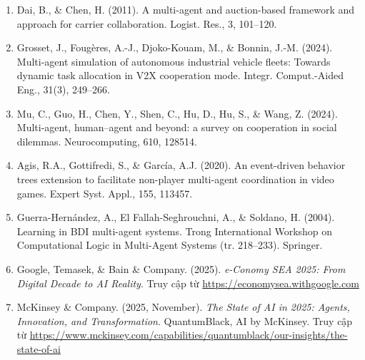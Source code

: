 \begin{enumerate}
  Laird, J.E. (2012). The Soar Cognitive Architecture. MIT Press.
\item
  Dai, B., \& Chen, H. (2011). A multi-agent and auction-based framework
  and approach for carrier collaboration. Logist. Res., 3, 101--120.
\item
  Grosset, J., Fougères, A.-J., Djoko-Kouam, M., \& Bonnin, J.-M.
  (2024). Multi-agent simulation of autonomous industrial vehicle
  fleets: Towards dynamic task allocation in V2X cooperation mode.
  Integr. Comput.-Aided Eng., 31(3), 249--266.
\item
  Mu, C., Guo, H., Chen, Y., Shen, C., Hu, D., Hu, S., \& Wang, Z.
  (2024). Multi-agent, human--agent and beyond: a survey on cooperation
  in social dilemmas. Neurocomputing, 610, 128514.
\item
  Agis, R.A., Gottifredi, S., \& García, A.J. (2020). An event-driven
  behavior trees extension to facilitate non-player multi-agent
  coordination in video games. Expert Syst. Appl., 155, 113457.
\item
  Guerra-Hernández, A., El Fallah-Seghrouchni, A., \& Soldano, H.
  (2004). Learning in BDI multi-agent systems. Trong International
  Workshop on Computational Logic in Multi-Agent Systems (tr. 218--233).
  Springer.
\item\label{ref:economy2025}
  Google, Temasek, \& Bain \& Company. (2025). \emph{e-Conomy SEA 2025:
  From Digital Decade to AI Reality}. Truy cập từ
  \url{https://economysea.withgoogle.com}
\item\label{ref:mckinsey2025}
  McKinsey \& Company. (2025, November). \emph{The State of AI in 2025:
  Agents, Innovation, and Transformation}. QuantumBlack, AI by
  McKinsey. Truy cập từ
  \url{https://www.mckinsey.com/capabilities/quantumblack/our-insights/the-state-of-ai}
\end{enumerate}
